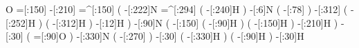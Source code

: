             O%
     =[:150]%
     -[:210]%
    =^[:150]%
               (
         -[:222]N%
        =^[:294]%
                   (
             -[:240]H%
                   )
           -[:6]N%
                   (
              -[:78]%
                   )
         -[:312]%
                   (
             -[:252]H%
                   )
                   (
             -[:312]H%
                   )
          -[:12]H%
               )
      -[:90]N%
               (
         -[:150]%
                   (
              -[:90]H%
                   )
                   (
             -[:150]H%
                   )
         -[:210]H%
               )
      -[:30]%
               (
          =[:90]O%
               )
     -[:330]N%
               (
         -[:270]%
               )
      -[:30]%
               (
         -[:330]H%
               )
               (
          -[:90]H%
               )
      -[:30]H%